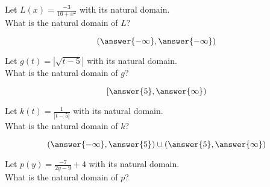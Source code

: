\documentclass{ximera}
\author{Lee Wayand}
\begin{document}
\begin{exercise}








\begin{question}


Let $L(x) = \frac{-3}{16 + x^2}$ with its natural domain. \\

What is the natural domain of $L$?

\[
\left( \answer{-\infty}, \answer{-\infty}  \right)
\]


\end{question}







\begin{question}


Let $g(t) = \left| \sqrt{t - 5} \right|$ with its natural domain. \\

What is the natural domain of $g$?

\[
\left[ \answer{5}, \answer{\infty}  \right)
\]


\end{question}








\begin{question}


Let $k(t) = \frac{1}{| t - 5 |}$ with its natural domain. \\

What is the natural domain of $k$?

\[
\left( \answer{-\infty}, \answer{5} \right) \cup \left( \answer{5}, \answer{\infty}  \right)
\]


\end{question}













\begin{question}


Let $p(y) = \frac{-7}{2y - 9} + 4$ with its natural domain. \\

What is the natural domain of $p$?


\end{question}
\end{exercise}
\end{document}
